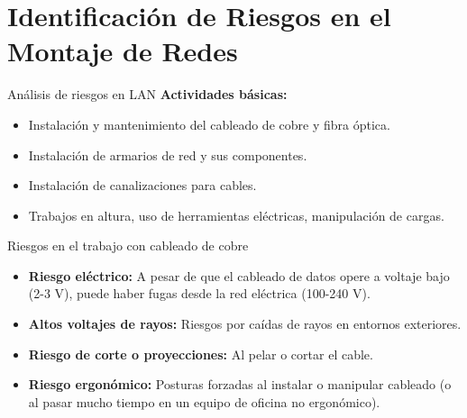 \documentclass{beamer}
\begin{document}
\section{Identificación de Riesgos en el Montaje de Redes}

\begin{frame}{Análisis de riesgos en LAN}
    \textbf{Actividades básicas:}
    \begin{itemize}
        \item Instalación y mantenimiento del cableado de cobre y fibra óptica.
        \item Instalación de armarios de red y sus componentes.
        \item Instalación de canalizaciones para cables.
        \item Trabajos en altura, uso de herramientas eléctricas, manipulación de cargas.
    \end{itemize}
\end{frame}

\begin{frame}{Riesgos en el trabajo con cableado de cobre}
    \begin{itemize}
        \item \textbf{Riesgo eléctrico:} A pesar de que el cableado de datos opere a voltaje bajo (2-3 V), puede haber fugas desde la red eléctrica (100-240 V).
        \item \textbf{Altos voltajes de rayos:} Riesgos por caídas de rayos en entornos exteriores.
        \item \textbf{Riesgo de corte o proyecciones:} Al pelar o cortar el cable.
        \item \textbf{Riesgo ergonómico:} Posturas forzadas al instalar o manipular cableado (o al pasar mucho tiempo en un equipo de oficina no ergonómico).
    \end{itemize}
\end{frame}
\end{document}
